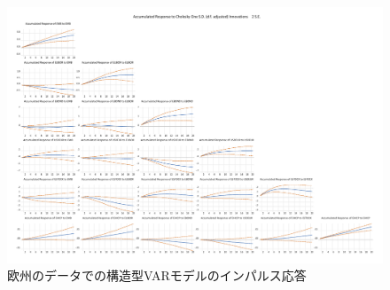 \documentclass[12pt]{jarticle}
\begin{document}
{\newpage
\begin{figure}[!htbp]
  \centering
  \caption{欧州のデータでの構造型VARモデルのインパルス応答}
  \vspace{10pt}
  \includegraphics[width=18cm]{eimpulse.pdf}
\end{figure}

}
\end{document}
